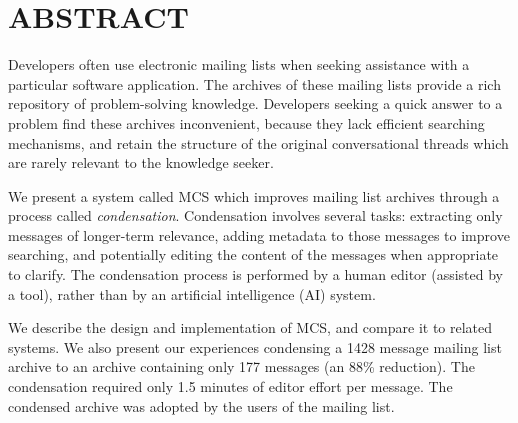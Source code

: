 
\thispagestyle{empty}  %





\section*{ABSTRACT}
Developers often use electronic mailing lists when seeking assistance with a
particular software application. The archives of these mailing lists provide a
rich repository of problem-solving knowledge. Developers seeking a quick answer
to a problem find these archives inconvenient, because they lack efficient
searching mechanisms, and retain the structure of the original conversational
threads which are rarely relevant to the knowledge seeker.

We present a system called MCS which improves mailing list archives through a
process called {\em condensation}. Condensation involves several tasks:
extracting only messages of longer-term relevance, adding metadata to those
messages to improve searching, and potentially editing the content of the
messages when appropriate to clarify. The condensation process is performed by
a human editor (assisted by a tool), rather than by an artificial intelligence
(AI) system.

We describe the design and implementation of MCS, and compare it to related
systems. We also present our experiences condensing a 1428 message mailing list
archive to an archive containing only 177 messages (an 88\% reduction). The
condensation required only 1.5 minutes of editor effort per message. The
condensed archive was adopted by the users of the mailing list.

